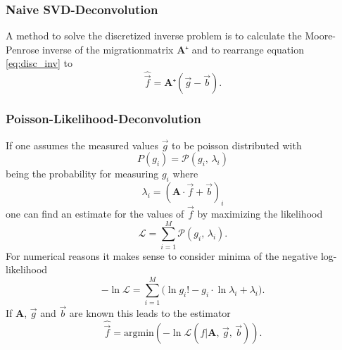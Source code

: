 \subsubsection{Naive SVD-Deconvolution}

A method to solve the discretized inverse problem is to calculate the Moore-Penrose inverse of the migrationmatrix $\textbf{A}⁺$ and to rearrange 
equation \eqref{eq:disc_inv} to 
\begin{equation}
    \hat{\vec{f}} = \textbf{A}⁺ ( \vec{g} - \vec{b} ) .
\end{equation}

\subsubsection{Poisson-Likelihood-Deconvolution}
If one assumes the measured values $\vec{g}$ to be poisson distributed with 
\begin{equation}
    P(g_i) = \mathcal{P}(g_i , \, \lambda_i)
\end{equation}
being the probability for measuring $g_i$ where 
\begin{equation}
    \lambda_i = (\textbf{A} \cdot \vec {f} + \vec{b})_i 
\end{equation}
one can find an estimate for the values of $\vec{f}$ by maximizing the likelihood
\begin{equation}
    \mathcal{L} = \sum_{i=1}^M \mathcal{P}(g_i, \, \lambda_i) . 
\end{equation}
For numerical reasons it makes sense to consider minima of the negative log-likelihood 
\begin{equation}
    - \ln \mathcal{L} = \sum_{i=1}^M \biggl( \ln g_i! - g_i \cdot \ln \lambda_i + \lambda_i \biggr) . 
\end{equation}
If $\textbf{A}$, $\vec{g}$ and $\vec{b}$ are known this leads to the estimator 
\begin{equation}
    \hat{ \vec{f}} = \text{argmin} ( - \ln \mathcal{L} (f | \textbf{A}, \, \vec{g}, \, \vec{b})).
\end{equation}
